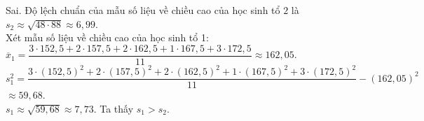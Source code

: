 \begin{ex}
{\begin{itemchoice}
			\itemch Sai. Độ lệch chuẩn của mẫu số liệu về chiều cao của học sinh tổ $2$ là\\ $s_2\approx \sqrt{48\cdot 88}\approx 6{,}99$.\\
			Xét mẫu số liệu về chiều cao của học sinh tổ 1:\\
			$\overline{x}_1=\dfrac{3\cdot 152{,}5+2\cdot 157{,}5+2\cdot 162{,}5+1\cdot 167{,}5+3\cdot 172{,}5}{11} \approx 162{,}05$.\\
			$s_1^2=\dfrac{3\cdot(152{,}5)^2+2\cdot(157{,}5)^2+2\cdot(162{,}5)^2+1\cdot(167{,}5)^2+3\cdot(172{,}5)^2}{11}-(162{,}05)^2$\\ $\approx 59{,}68$.\\
			$s_1\approx \sqrt{59{,}68}\approx 7{,}73$. Ta thấy $s_1>s_2$.
		\end{itemchoice}
	}
\end{ex}

